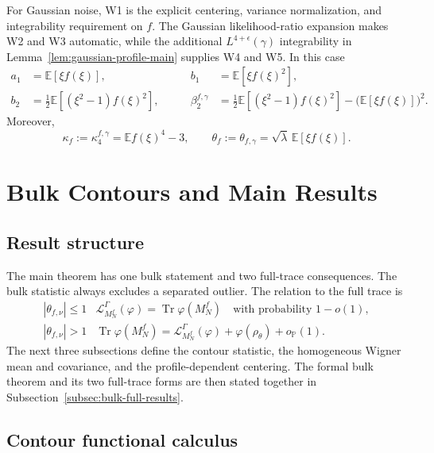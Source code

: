 \documentclass[11pt]{article}
\theoremstyle{definition}
\theoremstyle{remark}
\newcommand{\E}{\mathbb E}
\newcommand{\Tr}{\operatorname{Tr}}
\begin{document}
For Gaussian noise, W1 is the explicit centering, variance normalization, and
integrability requirement on $f$.  The Gaussian likelihood-ratio expansion
makes W2 and W3 automatic, while the additional
$L^{4+\epsilon}(\gamma)$ integrability in
Lemma~\ref{lem:gaussian-profile-main} supplies W4 and W5.  In this case
\begin{equation}\label{eq:Gaussian-coefficients-summary}
 \begin{aligned}
 a_1&=\E[\xi f(\xi)],
 &\qquad b_1&=\E[\xi f(\xi)^2],\\
 b_2&=\frac12\E[(\xi^2-1)f(\xi)^2],
 &\qquad \beta_2^{f,\gamma}
 &=\frac12\E[(\xi^2-1)f(\xi)^2]
  -\bigl(\E[\xi f(\xi)]\bigr)^2.
 \end{aligned}
\end{equation}
Moreover,
\begin{equation}\label{eq:Gaussian-kappa-theta-summary}
 \kappa_f:=\kappa_4^{f,\gamma}=\E f(\xi)^4-3,
 \qquad
 \theta_f:=\theta_{f,\gamma}
 =\sqrt\lambda\,\E[\xi f(\xi)].
\end{equation}
\section{Bulk Contours and Main Results}
\label{sec:bulk-main-results}

\subsection{Result structure}

The main theorem has one bulk statement and two full-trace consequences.  The
bulk statistic always excludes a separated outlier.  The relation to the full
trace is
\[
\begin{array}{c|c}
 |\theta_{f,\nu}|\leq1
 & \mathcal L_{M_N^f}^{\Gamma}(\varphi)=\Tr\varphi(M_N^f)
   \quad\text{with probability }1-o(1),\\[2mm]
 |\theta_{f,\nu}|>1
 & \Tr\varphi(M_N^f)
   =\mathcal L_{M_N^f}^{\Gamma}(\varphi)+\varphi(\rho_\theta)+o_{\mathbb P}(1).
\end{array}
\]
The next three subsections define the contour statistic, the homogeneous
Wigner mean and covariance, and the profile-dependent centering.  The formal
bulk theorem and its two full-trace forms are then stated together in
Subsection~\ref{subsec:bulk-full-results}.

\subsection{Contour functional calculus}
\end{document}
